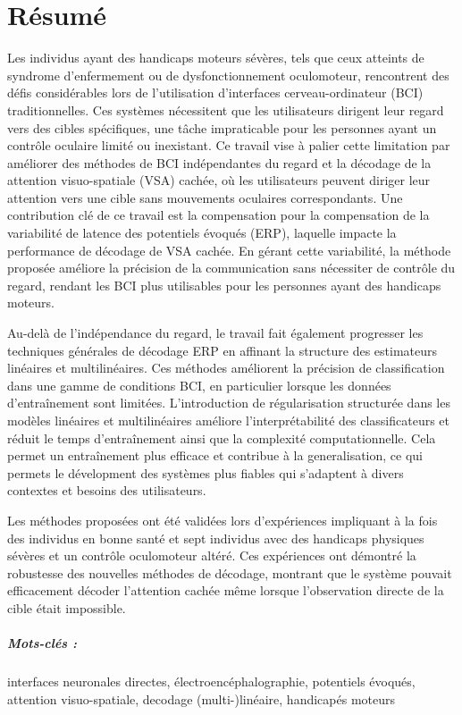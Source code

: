\chapter*{R\'esum\'e}

Les individus ayant des handicaps moteurs sévères, tels que ceux atteints de
syndrome d'enfermement ou de dysfonctionnement oculomoteur, rencontrent des défis considérables
lors de l'utilisation d'interfaces cerveau-ordinateur (BCI)  traditionnelles.
Ces systèmes nécessitent que les utilisateurs dirigent leur regard vers des
cibles spécifiques, une tâche impraticable pour les personnes ayant un contrôle oculaire limité ou inexistant.
Ce travail vise \`a palier cette limitation par améliorer des méthodes de BCI
indépendantes du regard et la décodage de la attention visuo-spatiale (VSA) cachée, où les utilisateurs peuvent diriger leur attention vers une cible sans mouvements oculaires correspondants.
Une contribution clé de ce travail est la compensation pour la compensation de
la variabilité de latence des potentiels évoqués (ERP), laquelle impacte
la performance de décodage de VSA cachée.
En gérant cette variabilit\'e, la méthode proposée améliore la précision de la communication
sans nécessiter de contrôle du regard, rendant les BCI plus utilisables pour les personnes ayant des handicaps moteurs.

Au-delà de l'indépendance du regard, le travail fait également progresser les
techniques générales de décodage ERP en affinant la structure des estimateurs
linéaires et multilinéaires.
Ces méthodes améliorent la précision de classification dans une gamme de
conditions BCI, en particulier lorsque les données d'entraînement sont limitées.
L'introduction de régularisation structurée dans les modèles linéaires et
multilinéaires améliore l'interprétabilité des classificateurs et réduit le temps d'entraînement ainsi que la complexité computationnelle.
Cela permet un entraînement plus efficace et contribue à la generalisation, ce qui
permets le d\'evelopment des systèmes plus fiables qui s'adaptent à divers
contextes et besoins des utilisateurs.

Les méthodes proposées ont été validées lors d'expériences impliquant à la fois
des individus en bonne santé et sept individus avec des handicaps physiques sévères et un contrôle oculomoteur altéré.
Ces expériences ont démontré la robustesse des nouvelles méthodes de décodage, montrant que le système pouvait efficacement décoder l'attention cachée même lorsque l'observation directe de la cible  était impossible.

\paragraph{Mots-clés :}
interfaces neuronales directes,
\'electroenc\'ephalographie,
potentiels \'evoqu\'es,
attention visuo-spatiale,
decodage (multi-)linéaire,
handicap\'es moteurs
